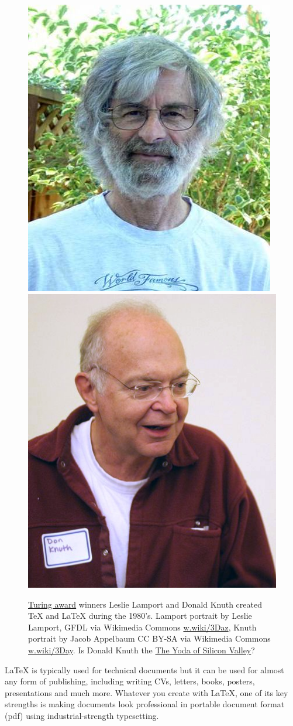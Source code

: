 \documentclass[
]{book}
\begin{document}
\begin{figure}
\includegraphics[width=0.47\linewidth]{images/Leslie_Lamport} \includegraphics[width=0.47\linewidth]{images/KnuthAtOpenContentAlliance} \caption{\href{https://en.wikipedia.org/wiki/Turing_Award}{Turing award} winners Leslie Lamport and Donald Knuth created TeX and LaTeX during the 1980's. Lamport portrait by Leslie Lamport, GFDL via Wikimedia Commons \href{https://w.wiki/3Daz}{w.wiki/3Daz}, Knuth portrait by Jacob Appelbaum CC BY-SA via Wikimedia Commons \href{https://w.wiki/3Day}{w.wiki/3Day}. Is Donald Knuth the \href{https://www.nytimes.com/2018/12/17/science/donald-knuth-computers-algorithms-programming.html}{The Yoda of Silicon Valley}? \citep{yoda}}\label{fig:knuthport-fig}
\end{figure}



LaTeX is typically used for technical documents but it can be used for almost any form of publishing, including writing CVs, letters, books, posters, presentations and much more. Whatever you create with LaTeX, one of its key strengths is making documents look professional in portable document format (pdf) using industrial-strength typesetting.
\end{document}
